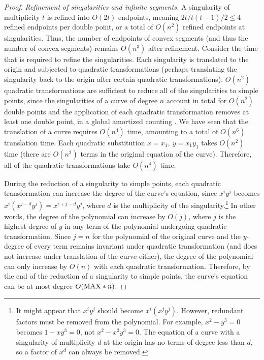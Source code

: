 \begin{proof}
{\em Refinement of singularities and infinite segments.}
%
A singularity of multiplicity $t$ is refined into $O(2t)$ endpoints, meaning
$2t / t(t-1) / 2 \leq 4$ refined endpoints per double point,
or a total of $O(n^{2})$ refined endpoints at singularities.
Thus, the number of endpoints of convex segments 
(and thus the number of convex segments) remains $O(n^{3})$ after refinement.
Consider the time that is required to refine the singularities.
Each singularity is translated to the origin and subjected to quadratic transformations
(perhaps translating the singularity back to the origin after certain quadratic 
transformations).
$O(n^{2})$ quadratic transformations are sufficient to reduce all of the singularities 
to simple points, since the singularities of a curve of degree $n$ account in total for 
$O(n^{2})$ double points and the application of each quadratic transformation 
removes at least one double point, in a global amortized counting \cite{abba3}. 
We have seen that the translation of a curve requires $O(n^{4})$ time, 
amounting to a total of $O(n^{6})$ translation time. 
Each quadratic substitution $x = x_{1},\ y = x_{1}y_{1}$ takes $O(n^{2})$ time 
(there are $O(n^2)$ terms in the original equation of the curve).
Therefore, all of the quadratic transformations take $O(n^{4})$ time.

During the reduction of a singularity to simple points, each quadratic
transformation can increase the degree of the curve's equation, since
$x^{i}y^{j}$ becomes $x^{i}(x^{j-d}y^{j}) = x^{i+j-d}y^{j}$, where $d$ is the 
multiplicity of the singularity.\footnote{It might appear that 
	$x^{i}y^{j}$ should become $x^{i}(x^{j}y^{j})$.  However,  
	redundant factors must be removed from the polynomial.
	For example, $x^{2} - y^{3} = 0$
	becomes $1-xy^{3} = 0$, not $x^{2} - x^{3}y^{3} = 0$.
	The equation of a curve with a singularity of multiplicity $d$ 
	at the origin has no terms of degree less than $d$, so a factor of $x^{d}$ can
	always be removed.}
In other words, the degree of the polynomial can increase by $O(j)$, where
$j$ is the highest degree of $y$ in any term of the polynomial undergoing 
quadratic transformation. 
Since $j=n$ for the polynomial of the original curve and the $y$-degree of every term
remains invariant under quadratic transformation (and does not increase under
translation of the curve either), the degree of the polynomial can only increase
by $O(n)$ with each quadratic transformation.
Therefore, by the end of the reduction of a singularity to simple points, 
the curve's equation can be at most degree $O({\rm MAX} * n)$.


\end{proof}
